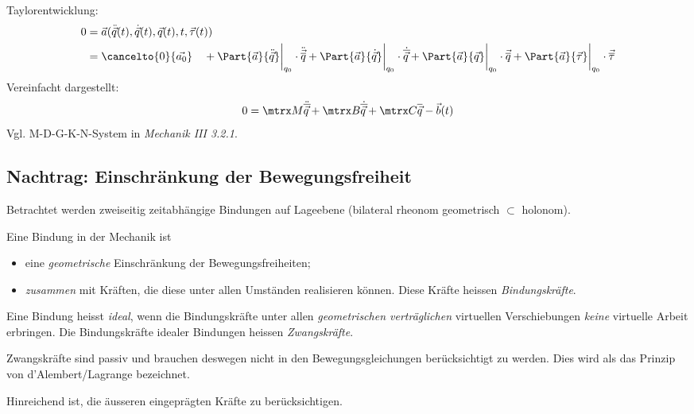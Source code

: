 		Taylorentwicklung:
		\begin{align*}
			0 &= \vec a(\ddot{\vec q}(t), \dot{\vec q}(t), \vec q(t), t, \vec\tau(t)) \\
			&= \cancelto{0}{\vec{a_0}} \quad + \Part{\vec a}{\ddot{\vec{q}}} \bigg|_{q_0} \cdot \ddot{\vec{\overline q}} + \Part{\vec a}{\dot{\vec q}} \bigg|_{q_0} \cdot \dot{\overline{\vec q}} + \Part{\vec a}{\vec q} \bigg|_{q_0} \cdot \vec{\overline q} + \Part{\vec a}{\vec\tau} \bigg|_{q_0} \cdot \vec{\overline \tau}
		\end{align*}
		Vereinfacht dargestellt:
		\[
			0 = \mtrx M \ddot{\overline{\vec q}} + \mtrx B \dot{\overline{\vec q}} + \mtrx C \overline{\vec q} - \vec b(t)
		\]
		Vgl. M-D-G-K-N-System in \emph{Mechanik III 3.2.1}.
	
	\subsection{Nachtrag: Einschränkung der Bewegungsfreiheit} %
		Betrachtet werden zweiseitig zeitabhängige Bindungen auf Lageebene (bilateral rheonom geometrisch $\subset$ holonom).
		
		\begin{definition}
			Eine Bindung in der Mechanik ist
			\begin{itemize}
				\item eine \emph{geometrische} Einschränkung der Bewegungsfreiheiten;
				\item \emph{zusammen} mit Kräften, die diese unter allen Umständen realisieren können. Diese Kräfte heissen \emph{Bindungskräfte}.
			\end{itemize}
		\end{definition}
		
		\begin{definition}
			Eine Bindung heisst \emph{ideal}, wenn die Bindungskräfte unter allen \emph{geometrischen verträglichen} virtuellen Verschiebungen \emph{keine} virtuelle Arbeit erbringen. Die Bindungskräfte idealer Bindungen heissen \emph{Zwangskräfte}.
		\end{definition}
		
		\begin{folgerung}
			Zwangskräfte sind passiv und brauchen deswegen nicht in den Bewegungsgleichungen berücksichtigt zu werden. Dies wird als das Prinzip von d'Alembert/Lagrange bezeichnet.
		\end{folgerung}
		
		Hinreichend ist, die äusseren eingeprägten Kräfte zu berücksichtigen.
	
